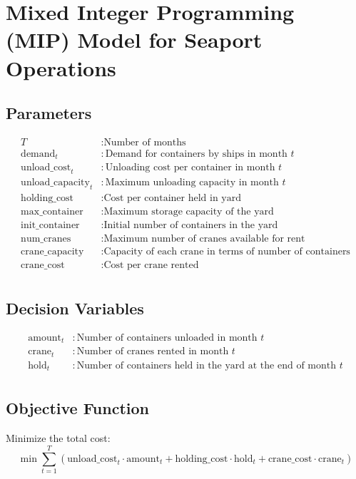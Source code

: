\documentclass{article}
\begin{document}
\section*{Mixed Integer Programming (MIP) Model for Seaport Operations}

\subsection*{Parameters}
\begin{align*}
    T & : \text{Number of months} \\
    \text{demand}_t & : \text{Demand for containers by ships in month } t \\
    \text{unload\_cost}_t & : \text{Unloading cost per container in month } t \\
    \text{unload\_capacity}_t & : \text{Maximum unloading capacity in month } t \\
    \text{holding\_cost} & : \text{Cost per container held in yard} \\
    \text{max\_container} & : \text{Maximum storage capacity of the yard} \\
    \text{init\_container} & : \text{Initial number of containers in the yard} \\
    \text{num\_cranes} & : \text{Maximum number of cranes available for rent} \\
    \text{crane\_capacity} & : \text{Capacity of each crane in terms of number of containers} \\
    \text{crane\_cost} & : \text{Cost per crane rented} \\
\end{align*}

\subsection*{Decision Variables}
\begin{align*}
    \text{amount}_t & : \text{Number of containers unloaded in month } t \\
    \text{crane}_t & : \text{Number of cranes rented in month } t \\
    \text{hold}_t & : \text{Number of containers held in the yard at the end of month } t \\
\end{align*}

\subsection*{Objective Function}
Minimize the total cost:
\[
\min \sum_{t=1}^{T} \left(\text{unload\_cost}_t \cdot \text{amount}_t + \text{holding\_cost} \cdot \text{hold}_t + \text{crane\_cost} \cdot \text{crane}_t \right)
\]
\end{document}
